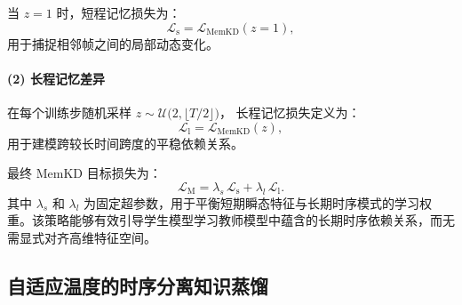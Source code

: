 \documentclass[a4paper, 12pt]{article}
\begin{document}
当 $z=1$ 时，短程记忆损失为：
\begin{equation}
    \mathcal{L}_{\text{s}}=\mathcal{L}_{\text{MemKD}}(z=1),
\end{equation}
用于捕捉相邻帧之间的局部动态变化。

\paragraph{(2) 长程记忆差异}
在每个训练步随机采样
\(
z \sim \mathcal{U}\big(2,\lfloor T/2 \rfloor\big)
\)，
长程记忆损失定义为：
\begin{equation}
    \mathcal{L}_{\text{l}}=\mathcal{L}_{\text{MemKD}}(z),
\end{equation}
用于建模跨较长时间跨度的平稳依赖关系。

最终 MemKD 目标损失为：
\begin{equation}
\mathcal{L}_{\text{M}}
=
\lambda_s\, \mathcal{L}_{\text{s}}
+
\lambda_l\, \mathcal{L}_{\text{l}}.
\end{equation}
其中 $\lambda_s$ 和 $\lambda_l$ 为固定超参数，用于平衡短期瞬态特征与长期时序模式的学习权重。该策略能够有效引导学生模型学习教师模型中蕴含的长期时序依赖关系，而无需显式对齐高维特征空间。


\subsection{自适应温度的时序分离知识蒸馏}
\label{subsec:tser}
\end{document}
